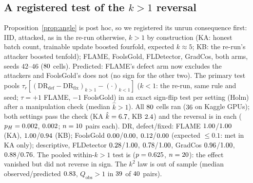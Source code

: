 \documentclass[journal]{IEEEtran}
\begin{document}
\subsection{A registered test of the $k>1$ reversal}
\label{sup:k1}
Proposition~\ref{prop:angle} is post hoc, so we registered its unrun consequence first: IID, attacked, as in the re-run otherwise, $k>1$ by construction
(KA: honest batch count, trainable update boosted fourfold, expected $k\approx5$; KB: the re-run's attacker
boosted tenfold); FLAME, FoolsGold, FLDetector, GradCos, both arms, seeds $42$--$46$
($80$ cells). Predicted: FLAME's defect arm now excludes the attackers and
FoolsGold's does not (no sign for the other two). The primary test pools
$\tau_r[(\mathrm{DR_{def}}-\mathrm{DR_{fix}})_{k>1}-(\cdot)_{k<1}]$ ($k<1$: the re-run, same rule and seed; $\tau=+1$
FLAME, $-1$ FoolsGold) in an exact sign-flip test per setting (Holm) after a manipulation
check (median $\hat k>1$). All $80$ cells ran ($36$ on Kaggle GPUs); both settings
pass the check (KA $\hat k=6.7$, KB $2.4$) and the reversal is \koAHOneSup{} in each
($p_H=0.002$, $0.002$; $n=10$ pairs each). DR, defect/fixed: FLAME $1.00$/$1.00$
(KA), $1.00$/$0.94$ (KB); FoolsGold $0.00$/$0.00$, $0.12$/$0.00$
(expected $\le0.1$: met in KA only); descriptive, FLDetector $0.28$/$1.00$,
$0.78$/$1.00$, GradCos $0.96$/$1.00$, $0.88$/$0.76$. The pooled
within-$k>1$ test is \koHTwoSup{} ($p=0.625$, $n=20$): the effect vanished but did not
reverse in sign. The $k^2$ law is \koMOneSup{} out of sample (median observed/predicted $0.83$,
$Q_{\mathrm{obs}}>1$ in $39$ of $40$ pairs).
\end{document}
